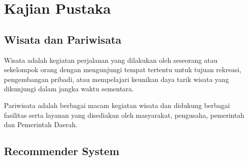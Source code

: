 \chapter{Kajian Pustaka}

\section{Wisata dan Pariwisata}
Wisata adalah kegiatan perjalanan yang dilakukan oleh seseorang atau sekelompok orang dengan mengunjungi tempat tertentu untuk tujuan rekreasi, pengembangan pribadi, atau mempelajari
keunikan daya tarik wisata yang dikunjungi dalam jangka waktu sementara\cite{oxford2005}.

Pariwisata adalah berbagai macam kegiatan wisata dan didukung berbagai fasilitas serta layanan yang disediakan oleh masyarakat, pengusaha, pemerintah dan Pemerintah Daerah\cite{uupariwisata}.

\section{Recommender System}

